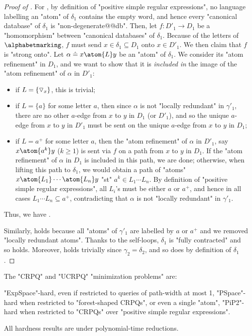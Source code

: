 \begin{proof}[Proof of ]
	For \axiomStrongCanonCore{}, by definition of "positive simple regular expressions",
	no language labelling an "atom" of $\delta_1$ contains the empty word, and hence
	every "canonical database" of $\delta_1$ is "non-degenerate@@db".
	Then, let $f\colon D'_1 \to D_1$ be a "homomorphism" between "canonical databases"
	of $\delta_1$. Because of the letters of $\alphabetmarking$,
	$f$ must send $x \in \delta_1 \subseteq D_1$
	onto $x \in D'_1$. We then claim that $f$ is "strong onto".
	Let $\alpha \defeq x \atom{L} y$ be an "atom" of $\delta_1$.
	We consider its "atom refinement" in $D_1$, and we want to show that it is
	\emph{included in} the image of the "atom refinement" of $\alpha$ in $D'_1$:
	\begin{itemize}
		\item if $L = \{\triangledown_x\}$, this is trivial;
		\item if $L = \{a\}$ for some letter $a$, then since
			$\alpha$ is not "locally redundant" in $\gamma'_1$,
			there are no other $a$-edge from $x$ to $y$ in $D_1$ (or $D'_1$),
			and so the unique $a$-edge from $x$ to $y$ in $D'_1$
			must be sent on the unique $a$-edge from $x$ to $y$ in $D_1$;
		\item if $L = a^+$ for some letter $a$, then the "atom refinement" of $\alpha$ in
			$D'_1$, say $x \atom{a^k} y$ ($k \geq 1$) is sent via $f$ on a path
			from $x$ to $y$ in $D_1$. If the "atom refinement" of $\alpha$ in $D_1$
			is included in this path, we are done; otherwise, when lifting
			this path to $\delta_1$, we would obtain a path of "atoms"
			$x \atom{L_1} \cdots \atom{L_n} y$ "st" $a^k \in L_1\cdots L_n$.
			By definition of "positive simple regular expressions", all $L_i$'s must
			be either $a$ or $a^+$, and hence in all cases $L_1 \cdots L_n \subseteq a^+$,
			contradicting that $\alpha$ is not "locally redundant" in $\gamma'_1$. 
	\end{itemize}
	Thus, we have \axiomStrongCanonCore{}.

	Similarly, \axiomCanonNonRed{} holds because all "atoms" of $\gamma'_1$ are labelled
	by $a$ or $a^+$ and we removed "locally redundant atoms".
	Thanks to the self-loops, $\delta_1$ is "fully contracted" and so \axiomCanonContracted{} holds.
	Moreover, \axiomCanonContainment{} holds trivially since $\gamma_2 = \delta_2$,
	and so does \axiomCanonMarking{} by definition of $\delta_1$.
\end{proof}

\begin{corollary}
	\AP\label{coro:lowerbounds}
	The "CRPQ" and "UCRPQ" "minimization problems" are:
	\begin{enumerate}
		\itemAP\label{expspace-h:pw1}"ExpSpace"-hard, even
		if restricted to queries of path-width at most 1,
		\itemAP\label{pspace:forest} "PSpace"-hard when restricted to "forest-shaped CRPQs",
		or even a single "atom",
		\itemAP\label{pip2:crpqsre} "PiP2"-hard when restricted to "CRPQs" over "positive simple regular expressions".
	\end{enumerate}
	All hardness results are under polynomial-time reductions.
\end{corollary}

